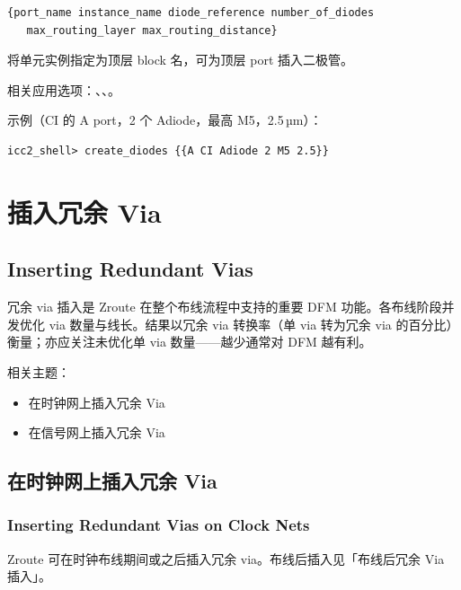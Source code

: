 \begin{lstlisting}
{port_name instance_name diode_reference number_of_diodes
   max_routing_layer max_routing_distance}
\end{lstlisting}

\begin{noteBox}
将单元实例指定为顶层 block 名，可为顶层 port 插入二极管。
\end{noteBox}

相关应用选项：、、。

示例（CI 的 A port，2 个 Adiode，最高 M5，2.5\,µm）：
\begin{lstlisting}
icc2_shell> create_diodes {{A CI Adiode 2 M5 2.5}}
\end{lstlisting}

\section{插入冗余 Via}
\subsection*{Inserting Redundant Vias}

冗余 via 插入是 Zroute 在整个布线流程中支持的重要 DFM 功能。各布线阶段并发优化 via 数量与线长。结果以冗余 via 转换率（单 via 转为冗余 via 的百分比）衡量；亦应关注未优化单 via 数量——越少通常对 DFM 越有利。

相关主题：
\begin{itemize}
  \item 在时钟网上插入冗余 Via
  \item 在信号网上插入冗余 Via
\end{itemize}

\subsection{在时钟网上插入冗余 Via}
\subsubsection*{Inserting Redundant Vias on Clock Nets}

Zroute 可在时钟布线期间或之后插入冗余 via。布线后插入见「布线后冗余 Via 插入」。

